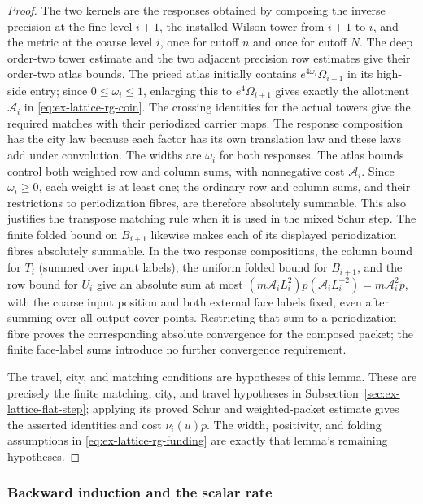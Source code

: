 \begin{proof}
The two kernels are the responses obtained by composing the inverse
precision at the fine level $i+1$, the installed Wilson tower from $i+1$
to $i$, and the metric at the coarse level $i$, once for cutoff $n$ and
once for cutoff $N$. The deep
order-two tower estimate and the two adjacent precision row estimates give
their order-two atlas bounds. The priced atlas initially contains
$e^{4\omega_i}\Omega_{i+1}$ in its high-side entry; since
$0\leq\omega_i\leq1$, enlarging this to $e^4\Omega_{i+1}$ gives exactly
the allotment $\mathcal A_i$ in \eqref{eq:ex-lattice-rg-coin}.
The crossing identities for the actual towers give the required matches
with their periodized carrier maps. The response composition has the city
law because each factor has its own translation law and these laws add
under convolution. The widths are $\omega_i$ for both responses. The atlas
bounds control both weighted row and column sums, with nonnegative cost
$\mathcal A_i$. Since $\omega_i\geq0$, each weight is at least one; the
ordinary row and column sums, and their restrictions to periodization
fibres, are therefore absolutely summable. This also justifies the transpose
matching rule when it is used in the mixed Schur step.
The finite folded bound on $B_{i+1}$ likewise makes each of its displayed
periodization fibres absolutely summable. In the two response compositions,
the column bound for $T_i$ (summed over input labels), the uniform folded bound for $B_{i+1}$, and the
row bound for $U_i$ give an absolute sum at most
$(m\mathcal A_iL_i^2)p(\mathcal A_iL_i^{-2})=m\mathcal A_i^2p$,
with the coarse input position and both external face labels fixed, even
after summing over all output cover points. Restricting that sum
to a periodization fibre proves the corresponding absolute convergence for
the composed packet; the finite face-label sums introduce no further
convergence requirement.

The travel, city, and matching conditions are hypotheses of this lemma. These are precisely the finite matching, city, and travel hypotheses in
Subsection~\ref{sec:ex-lattice-flat-step}; applying its proved Schur and
weighted-packet estimate gives the asserted identities and cost
$\nu_i(u)p$. The width, positivity, and folding assumptions in
\eqref{eq:ex-lattice-rg-funding} are exactly that lemma's remaining
hypotheses.
\end{proof}

\subsubsection{Backward induction and the scalar rate}

